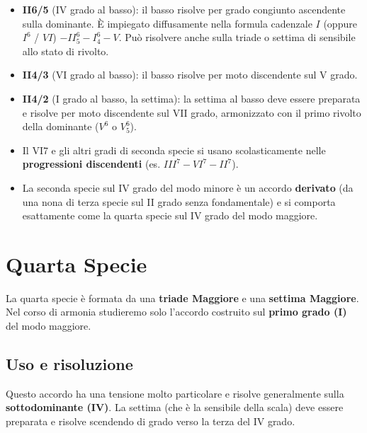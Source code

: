 \begin{itemize}
	\item \textbf{II6/5} (IV grado al basso): il basso risolve per grado congiunto ascendente sulla dominante. È impiegato diffusamente nella formula cadenzale $I$ (oppure $I^6$ / $VI$) $- II^6_5 - I^6_4 - V$. Può risolvere anche sulla triade o settima di sensibile allo stato di rivolto.
	\item \textbf{II4/3} (VI grado al basso): il basso risolve per moto discendente sul V grado.
	\item \textbf{II4/2} (I grado al basso, la settima): la settima al basso deve essere preparata e risolve per moto discendente sul VII grado, armonizzato con il primo rivolto della dominante ($V^6$ o $V^6_5$).
\end{itemize}

\begin{osservazione}
	\label{oss:ii7_progressioni}
	\begin{itemize}
		\item Il VI7 e gli altri gradi di seconda specie si usano scolasticamente nelle \textbf{progressioni discendenti} (es. $III^7 - VI^7 - II^7$).
		\item La seconda specie sul IV grado del modo minore è un accordo \textbf{derivato} (da una nona di terza specie sul II grado senza fondamentale) e si comporta esattamente come la quarta specie sul IV grado del modo maggiore.
	\end{itemize}
\end{osservazione}

\section{Quarta Specie}
\label{sec:quarta_specie_dettaglio}

La quarta specie è formata da una \textbf{triade Maggiore} e una \textbf{settima Maggiore}. Nel corso di armonia studieremo solo l'accordo costruito sul \textbf{primo grado (I)} del modo maggiore.

\subsection{Uso e risoluzione}
Questo accordo ha una tensione molto particolare e risolve generalmente sulla \textbf{sottodominante (IV)}. La settima (che è la sensibile della scala) deve essere preparata e risolve scendendo di grado verso la terza del IV grado.

